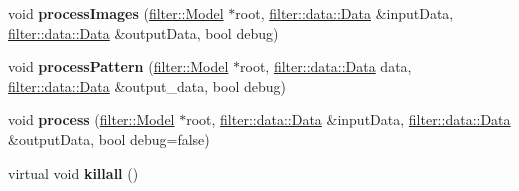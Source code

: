 \begin{DoxyCompactItemize}
void {\bfseries process\+Images} (\hyperlink{classfilter_1_1_model}{filter\+::\+Model} $\ast$root, \hyperlink{classfilter_1_1data_1_1_data}{filter\+::data\+::\+Data} \&input\+Data, \hyperlink{classfilter_1_1data_1_1_data}{filter\+::data\+::\+Data} \&output\+Data, bool debug)
\item 
\mbox{\label{classorchestrator_1_1image_1_1_default_scheduler_ac3f702904a59c02604088e836bae8c33}} 
void {\bfseries process\+Pattern} (\hyperlink{classfilter_1_1_model}{filter\+::\+Model} $\ast$root, \hyperlink{classfilter_1_1data_1_1_data}{filter\+::data\+::\+Data} data, \hyperlink{classfilter_1_1data_1_1_data}{filter\+::data\+::\+Data} \&output\+\_\+data, bool debug)
\item 
\mbox{\label{classorchestrator_1_1image_1_1_default_scheduler_a4d6d533550cadc8852d24672b7669be3}} 
void {\bfseries process} (\hyperlink{classfilter_1_1_model}{filter\+::\+Model} $\ast$root, \hyperlink{classfilter_1_1data_1_1_data}{filter\+::data\+::\+Data} \&input\+Data, \hyperlink{classfilter_1_1data_1_1_data}{filter\+::data\+::\+Data} \&output\+Data, bool debug=false)
\item 
\mbox{\label{classorchestrator_1_1image_1_1_default_scheduler_addd713281367b509cf393463ece3c709}} 
virtual void {\bfseries killall} ()
\end{DoxyCompactItemize}
